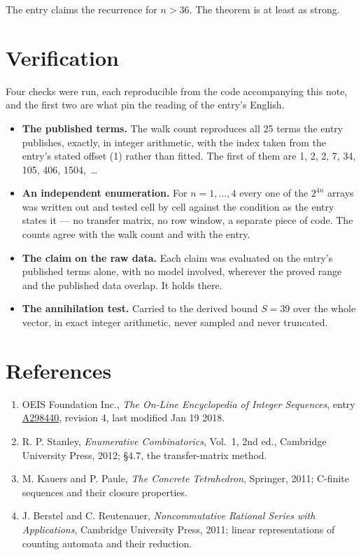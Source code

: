 \documentclass[11pt]{article}
\theoremstyle{definition}
\begin{document}
The entry claims the recurrence for $n > 36$. The theorem is at least as strong.

\section{Verification}

Four checks were run, each reproducible from the code accompanying this note, and the first two are what pin the reading of the entry's English.

\begin{itemize}

\item {\bfseries The published terms.} The walk count reproduces all 25 terms the entry publishes, exactly, in integer arithmetic, with the index taken from the entry's stated offset (1) rather than fitted. The first of them are 1, 2, 2, 7, 34, 105, 406, 1504,~\dots

\item {\bfseries An independent enumeration.} For $n = 1,\dots,4$ every one of the $2^{4n}$ arrays was written out and tested cell by cell against the condition as the entry states it --- no transfer matrix, no row window, a separate piece of code. The counts agree with the walk count and with the entry.

\item {\bfseries The claim on the raw data.} Each claim was evaluated on the entry's published terms alone, with no model involved, wherever the proved range and the published data overlap. It holds there.

\item {\bfseries The annihilation test.} Carried to the derived bound $S = 39$ over the whole vector, in exact integer arithmetic, never sampled and never truncated.

\end{itemize}

\section{References}

\begin{enumerate}

\item OEIS Foundation Inc., \emph{The On-Line Encyclopedia of Integer Sequences}, entry \href{https://oeis.org/A298440}{A298440}, revision 4, last modified Jan 19 2018.

\item R. P. Stanley, \emph{Enumerative Combinatorics}, Vol.~1, 2nd ed., Cambridge University Press, 2012; \S4.7, the transfer-matrix method.

\item M. Kauers and P. Paule, \emph{The Concrete Tetrahedron}, Springer, 2011; C-finite sequences and their closure properties.

\item J. Berstel and C. Reutenauer, \emph{Noncommutative Rational Series with Applications}, Cambridge University Press, 2011; linear representations of counting automata and their reduction.

\end{enumerate}
\end{document}
